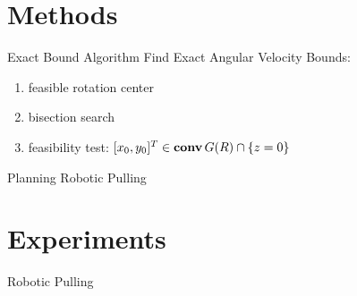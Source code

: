\documentclass[10pt]{beamer}
\newcommand{\themename}{\textbf{\textsc{metropolis}}\xspace}
\newcommand{\conv}{\mathop{\bf conv}}
\begin{document}
\section{Methods}

\begin{frame}{Exact Bound Algorithm}
  Find Exact Angular Velocity Bounds:
  \begin{enumerate}
  \item feasible rotation center
  \item bisection search
  \item feasibility test:
    $[x_0,y_0]^T \in \conv G(R) \cap \{z=0\}$
  \end{enumerate}
\end{frame}

\begin{frame}{Planning Robotic Pulling}
  
\end{frame}

\section{Experiments}

\begin{frame}{Robotic Pulling}
  
\end{frame}






\end{document}

